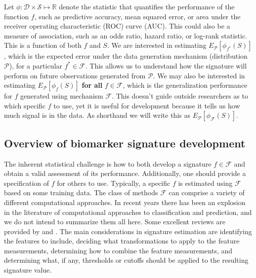 \documentclass[11pt,]{article}
\begin{document}
Let \(\phi: \mathcal{D} \times \mathcal{S} \mapsto \mathbb{R}\) denote
the statistic that quantifies the performance of the function \(f\),
such as predictive accuracy, mean squared error, or area under the
receiver operating characteristic (ROC) curve (AUC). This could also be
a measure of association, such as an odds ratio, hazard ratio, or
log-rank statistic. This is a function of both \(f\) and \(S\). We are
interested in estimating \(E_\mathcal{P}[\phi_{f^*}(S)]\), which is the
expected error under the data generation mechanism (distribution
\(\mathcal{P}\)), for a particular \(f^* \in \mathcal{F}\). This allows
us to understand how the signature will perform on future observations
generated from \(\mathcal{P}\). We may also be interested in estimating
\(E_\mathcal{P}[\phi_f(S)]\) \textbf{for all} \(f \in \mathcal{F}\),
which is the generalization performance for \(f\) generated using
mechanism \(\mathcal{F}\). This doesn't guide outside researchers as to
which specific \(f\) to use, yet it is useful for development because it
tells us how much signal is in the data. As shorthand we will write this
as \(E_\mathcal{P}[\phi_\mathcal{F}(S)]\).

\subsection{Overview of biomarker signature
development}\label{overview-of-biomarker-signature-development}

The inherent statistical challenge is how to both develop a signature
\(f \in \mathcal{F}\) and obtain a valid assessment of its performance.
Additionally, one should provide a specification of \(f\) for others to
use. Typically, a specific \(f\) is estimated using \(\mathcal{F}\)
based on some training data. The class of methods \(\mathcal{F}\) can
comprise a variety of different computational approaches. In recent
years there has been an explosion in the literature of computational
approaches to classification and prediction, and we do not intend to
summarize them all here. Some excellent reviews are provided by
\citet{hastie2009elements} and \citet{moons2012riskI}. The main
considerations in signature estimation are identifying the features to
include, deciding what transformations to apply to the feature
measurements, determining how to combine the feature measurements, and
determining what, if any, thresholds or cutoffs should be applied to the
resulting signature value.
\end{document}
